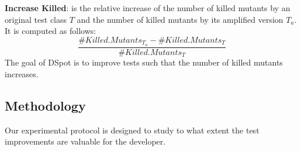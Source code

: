 \documentclass[table,xcdraw,smallextended]{svjour3}
\newcommand{\dspot}{DSpot\xspace}
\begin{document}
\textbf{Increase Killed}: is the relative increase of the number of killed mutants by an original test class $T$ and the number of killed mutants by its amplified version $T_a$.  It is computed as follows:
$$\frac{\#Killed.Mutants_{T_a} - \#Killed.Mutants_T}{\#Killed.Mutants_T}$$
The goal of \dspot is to improve tests such that the number of killed mutants  increases.

\subsection{Methodology}
\label{sec:methodo}

Our experimental protocol is designed to 
study to what extent the test improvements
are valuable for the developer.
\end{document}
